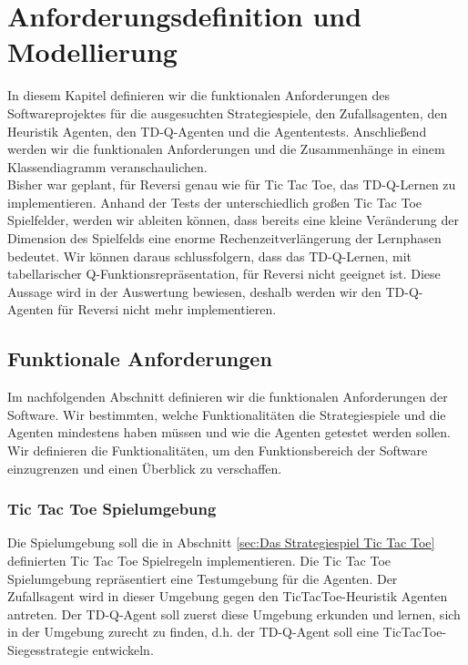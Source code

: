 \chapter{Anforderungsdefinition und Modellierung}
\label{cha:Anforderungsdefinition und Modellierung}

In diesem Kapitel definieren wir die funktionalen Anforderungen des Softwareprojektes für die ausgesuchten Strategiespiele, den Zufallsagenten, den Heuristik Agenten, den TD-Q-Agenten und die Agententests. Anschließend werden wir die funktionalen Anforderungen und die Zusammenhänge in einem Klassendiagramm veranschaulichen. \\

Bisher war geplant, für Reversi genau wie für Tic Tac Toe, das TD-Q-Lernen zu implementieren. Anhand der Tests der unterschiedlich großen Tic Tac Toe Spielfelder, werden wir ableiten können, dass bereits eine kleine Veränderung der Dimension des Spielfelds eine enorme Rechenzeitverlängerung der Lernphasen bedeutet. Wir können daraus schlussfolgern, dass das TD-Q-Lernen, mit tabellarischer Q-Funktionsrepräsentation, für Reversi nicht geeignet ist. Diese Aussage wird in der Auswertung bewiesen, deshalb werden wir den TD-Q-Agenten für Reversi nicht mehr implementieren. \\

\section{Funktionale Anforderungen}
\label{sec:Funktionale Anforderungen}
Im nachfolgenden Abschnitt definieren wir die funktionalen Anforderungen der Software. Wir bestimmten, welche Funktionalitäten die Strategiespiele und die Agenten mindestens haben müssen und wie die Agenten getestet werden sollen. Wir definieren die Funktionalitäten, um den Funktionsbereich der Software einzugrenzen und einen Überblick zu verschaffen.
\newpage

\subsection{Tic Tac Toe Spielumgebung}
Die Spielumgebung soll die in Abschnitt \ref{sec:Das Strategiespiel Tic Tac Toe} definierten Tic Tac Toe Spielregeln implementieren. Die Tic Tac Toe Spielumgebung repräsentiert eine Testumgebung für die Agenten. Der Zufallsagent wird in dieser Umgebung gegen den TicTacToe-Heuristik Agenten antreten. Der TD-Q-Agent soll zuerst diese Umgebung erkunden und lernen, sich in der Umgebung zurecht zu finden, d.h. der TD-Q-Agent soll eine TicTacToe-Siegesstrategie entwickeln. 

